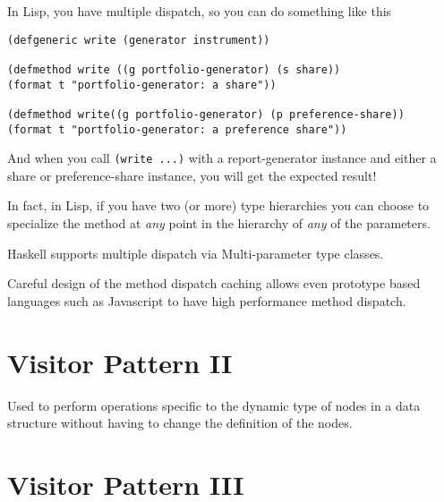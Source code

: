 In Lisp, you have multiple dispatch, so you can do something like this

\begin{lstlisting}
(defgeneric write (generator instrument))

(defmethod write ((g portfolio-generator) (s share))
(format t "portfolio-generator: a share"))

(defmethod write((g portfolio-generator) (p preference-share))
(format t "portfolio-generator: a preference share"))
\end{lstlisting}

And when you call \lstinline{(write ...)} with a report-generator 
instance and either a share or preference-share instance, you will get the expected result!

In fact, in Lisp, if you have two (or more) type hierarchies you can 
choose to specialize the method at \textit{any} point in the hierarchy of \textit{any} 
of the parameters. 

Haskell supports multiple dispatch 
via Multi-parameter type classes.



\frmrule

Careful design of the method dispatch caching allows even prototype based languages 
such as Javascript to have high performance method dispatch.




\section{Visitor Pattern II}


Used to perform operations specific to the dynamic type of nodes in a data structure without 
having to change the definition of the nodes.



\section{Visitor Pattern III}










